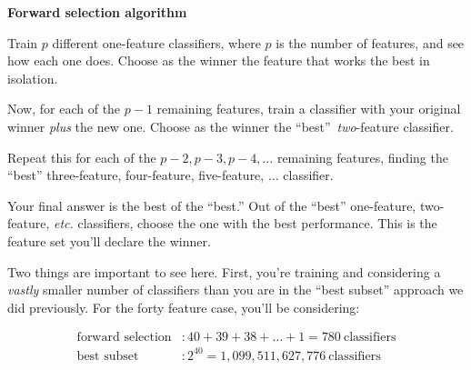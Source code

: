 \begin{shaded}
\vspace{-.2in}
\begin{center}
\textbf{Forward selection algorithm}
\end{center}

\begin{compactenum}
\small
\item Train $p$ different one-feature classifiers, where $p$ is the number of
features, and see how each one does. Choose as the winner the feature that
works the best in isolation.
\item Now, for each of the $p-1$ remaining features, train a classifier with
your original winner \textit{plus} the new one. Choose as the winner the
``best''\footnotemark\ \textit{two}-feature classifier.
\item Repeat this for each of the $p-2, p-3, p-4, \dots$ remaining features,
finding the ``best'' three-feature, four-feature, five-feature, $\dots$
classifier.
\item Your final answer is the best of the ``best.'' Out of the ``best''
one-feature, two-feature, \textit{etc.} classifiers, choose the one with the
best performance. This is the feature set you'll declare the winner.
\end{compactenum}
\end{shaded}


Two things are important to see here. First, you're training and considering a
\textit{vastly} smaller number of classifiers than you are in the ``best
subset'' approach we did previously. For the forty feature case, you'll be
considering:

\vspace{-.25in}
\begin{align*}
\textrm{forward selection}&: 40 + 39 + 38 + \dots + 1 = 780\ \textrm{classifiers}\\
\textrm{best subset}&: 2^{40} = 1,099,511,627,776\ \textrm{classifiers}\\
\end{align*}
\vspace{-.45in}

